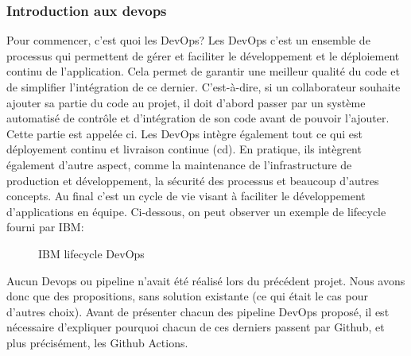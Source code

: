 \documentclass[
    iai, %
    il, %
]{heig-tb}
\begin{document}
\subsubsection{Introduction aux \Gls{devops}}
Pour commencer, c'est quoi les DevOps?
Les DevOps c'est un ensemble de processus qui permettent de gérer et faciliter le développement et le déploiement continu de l'application. Cela permet de garantir une meilleur qualité du code et de simplifier l'intégration de ce dernier. C'est-à-dire, si un collaborateur souhaite ajouter sa partie du code au projet, il doit d'abord passer par un système automatisé de contrôle et d'intégration de son code avant de pouvoir l'ajouter. Cette partie est appelée \Gls{ci}.
Les DevOps intègre également tout ce qui est déployement continu et livraison continue (\Gls{cd}).
En pratique, ils intègrent également d'autre aspect, comme la maintenance de l'infrastructure de production et développement, la sécurité des processus et beaucoup d'autres concepts.
Au final c'est un cycle de vie visant à faciliter le développement d'applications en équipe.
Ci-dessous, on peut observer un exemple de lifecycle fourni par IBM:
\begin{figure}
    \caption{IBM lifecycle DevOps}
\end{figure}


Aucun Devops ou pipeline n'avait été réalisé lors du précédent projet.
Nous avons donc que des propositions, sans solution existante (ce qui était le cas pour d'autres choix).
Avant de présenter chacun des pipeline DevOps proposé, il est nécessaire d'expliquer pourquoi chacun de ces derniers passent par Github, et plus précisément, les Github Actions.
\end{document}
